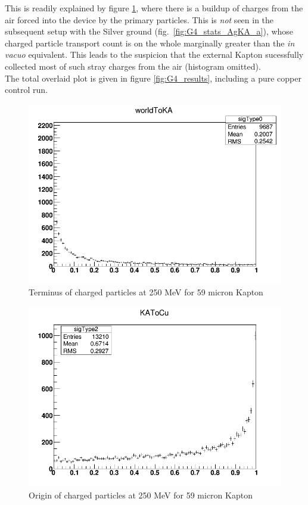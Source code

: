 \documentclass{article}
\begin{document}
This is readily explained by figure \ref{fig:G4_stats_a}, where there is a buildup of charges from the air forced into the device by the primary particles.  This is \emph{not} seen in the subsequent setup with the Silver ground (fig.~\ref{fig:G4_stats_AgKA_a}), whose charged particle transport count is on the whole marginally greater than the \emph{in vacuo} equivalent.  This leads to the suspicion that the external Kapton sucessfully collected most of such stray charges from the air (histogram omitted). \\

The total overlaid plot is given in figure \ref{fig:G4_results}, including a pure copper control run.

\begin{figure}[H]
\centering
\includegraphics[width=6in]{figures/Cu_KA/S59/WorldtoKA.png}
\caption{Terminus of charged particles at 250 MeV for 59 micron Kapton}
\label{fig:G4_stats_a}
\end{figure}

\begin{figure}[H]
\centering
\includegraphics[width=6in]{figures/Cu_KA/S59/KAtoCu.png}
\caption{Origin of charged particles at 250 MeV for 59 micron Kapton}
\label{fig:G4_stats_b}
\end{figure}
\end{document}

